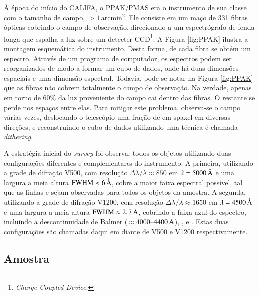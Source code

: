 À época do início do CALIFA, o PPAK/PMAS era o instrumento de sua classe com o
tamanho de campo, $>1\,\mathrm{arcmin}^2$. Ele consiste em um maço de 331 fibras
ópticas cobrindo o campo de observação, direcionado a um espectrógrafo de fenda
longa que espalha a luz sobre um detector CCD\footnote{{\em Charge Coupled
Device}.}. A Figura \ref{fig:PPAK} ilustra a montagem esquemática do
instrumento. Desta forma, de cada fibra se obtém um espectro. Através de um
programa de computador, os espectros podem ser reorganizados de modo a formar um
cubo de dados, onde há duas dimensões espaciais e uma dimensão espectral.
Todavia, pode-se notar na Figura \ref{fig:PPAK} que as fibras não cobrem
totalmente o campo de observação. Na verdade, apenas em torno de 60\% da luz
proveniente do campo cai dentro das fibras. O restante se perde nos espaços
entre elas. Para mitigar este problema, observa-se o campo várias vezes,
deslocando o telescópio uma fração de {em spaxel} em diversas direções, e
reconstruindo o cubo de dados utilizando uma técnica é chamada {\em dithering}.

A estratégia inicial do {\em survey} foi observar todos os objetos utilizando
duas configurações diferentes e complementares do instrumento. A primeira,
utilizando a grade de difração V500, com resolução $\Delta \lambda / \lambda
\approx 850$ em $\lambda = 5000\,\text{\normalfont\AA}$ e uma largura a meia altura
$\mathrm{FWHM} \approx 6\,\text{\normalfont\AA}$, cobre a maior faixa espectral possível,
tal que as linhas \OII e \SII sejam observadas para todos os objetos da amostra.
A segunda, utilizando a grade de difração V1200, com resolução $\Delta \lambda /
\lambda \approx 1650$ em $\lambda = 4500\,\text{\normalfont\AA}$ e uma largura a meia altura
$\mathrm{FWHM} \approx 2,7\,\text{\normalfont\AA}$, cobrindo a faixa azul do espectro,
incluindo a descontinuidade de Balmer ($\approx 4000$--$4400\,\text{\normalfont\AA}$),
\Hdelta, \Hgamma e . Estas duas configurações são chamadas daqui em
diante de V500 e V1200 respectivamente.

\subsection{Amostra}

